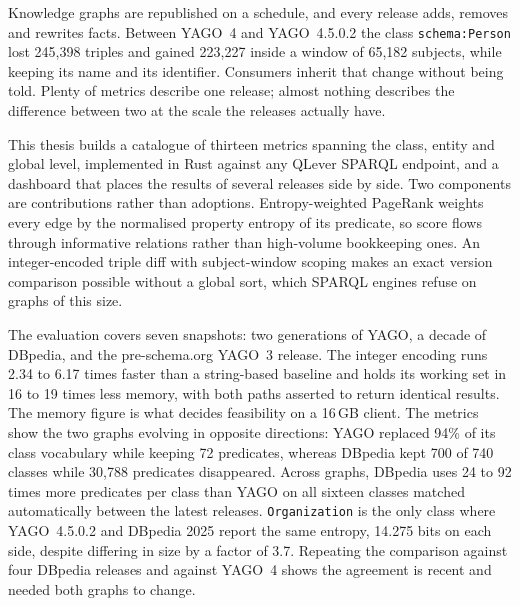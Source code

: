 Knowledge graphs are republished on a schedule, and every release adds, removes
and rewrites facts. Between YAGO~4 and YAGO~4.5.0.2 the class
\texttt{schema:Person} lost 245{,}398 triples and gained 223{,}227 inside a
window of 65{,}182 subjects, while keeping its name and its identifier.
Consumers inherit that change without being told. Plenty of metrics describe one
release; almost nothing describes the difference between two at the scale the
releases actually have.

This thesis builds a catalogue of thirteen metrics spanning the class, entity
and global level, implemented in Rust against any QLever SPARQL endpoint, and a
dashboard that places the results of several releases side by side. Two
components are contributions rather than adoptions. Entropy-weighted PageRank
weights every edge by the normalised property entropy of its predicate, so score
flows through informative relations rather than high-volume bookkeeping ones. An
integer-encoded triple diff with subject-window scoping makes an exact version
comparison possible without a global sort, which SPARQL engines refuse on graphs
of this size.

The evaluation covers seven snapshots: two generations of YAGO, a decade of
DBpedia, and the pre-schema.org YAGO~3 release. The integer encoding runs 2.34 to
6.17 times faster than a string-based baseline and holds its working set in 16 to
19 times less memory, with both paths asserted to return identical results. The
memory figure is what decides feasibility on a 16\,GB client. The metrics show
the two graphs evolving in opposite directions: YAGO replaced 94\% of its class
vocabulary while keeping 72 predicates, whereas DBpedia kept 700 of 740 classes
while 30{,}788 predicates disappeared. Across graphs, DBpedia uses 24 to 92
times more predicates per class than YAGO on all sixteen classes matched
automatically between the latest releases. \texttt{Organization} is the only
class where YAGO~4.5.0.2 and DBpedia 2025 report the same entropy, 14.275 bits
on each side, despite differing in size by a factor of 3.7. Repeating the
comparison against four DBpedia releases and against YAGO~4 shows the agreement
is recent and needed both graphs to change.
